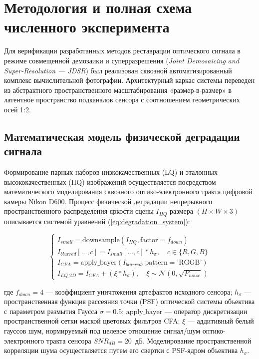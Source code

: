 \documentclass[12pt,a4paper,oneside]{article}
\begin{document}
\section{Методология и полная схема численного эксперимента}

Для верификации разработанных методов реставрации оптического сигнала в режиме совмещенной демозаики и суперразрешения (\textit{Joint Demosaicing and Super-Resolution — JDSR}) был реализован сквозной автоматизированный комплекс вычислительной фотографии. Архитектурный каркас системы переведен из абстрактного пространственного масштабирования «размер-в-размер» в латентное пространство подканалов сенсора с соотношением геометрических осей 1:2.

\subsection{Математическая модель физической деградации сигнала}

Формирование парных наборов низкокачественных (LQ) и эталонных высококачественных (HQ) изображений осуществляется посредством математического моделирования сквозного оптико-электронного тракта цифровой камеры Nikon D600. Процесс физической деградации непрерывного пространственного распределения яркости сцены $I_{HQ}$ размера $(H \times W \times 3)$ описывается системой уравнений (\ref{eq:degradation_system}):

\begin{equation}\label{eq:degradation_system}
\begin{cases}
I_{small} = \text{downsample}(I_{HQ}, \text{factor} = f_{down}) \\
I_{blurred}[..., c] = I_{small}[..., c] * h_{\sigma}, \quad c \in \{R, G, B\} \\
I_{CFA} = \text{apply\_bayer}(I_{blurred}, \text{pattern} = \text{'RGGB'}) \\
I_{LQ\_2D} = I_{CFA} + (\xi * h_{\sigma}), \quad \xi \sim \mathcal{N}(0, \sqrt{P_{noise}})
\end{cases}
\end{equation}

где $f_{down} = 4$ — коэффициент уничтожения артефактов исходного сенсора; $h_{\sigma}$ — пространственная функция рассеяния точки (PSF) оптической системы объектива с параметром размытия Гаусса $\sigma = 0.5$; $\text{apply\_bayer}$ — оператор дискретизации пространственной сетки маской цветовых фильтров CFA; $\xi$ — аддитивный белый гауссов шум, нормируемый под целевое отношение сигнал/шум оптико-электронного тракта сенсора $SNR_{dB} = 20$~дБ. Моделирование пространственной корреляции шума осуществляется путем его свертки с PSF-ядром объектива $h_{\sigma}$.
\end{document}
